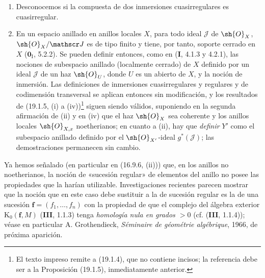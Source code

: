 \begin{remarks}[19.1.7]
\label{IV.19.1.7}
\begin{enumerate}
  \item[(i)] Desconocemos si la compuesta de dos inmersiones cuasirregulares es cuasirregular.
  \item[(ii)] En un espacio anillado en anillos locales $X$, para todo ideal $\mathscr J$ de $\sh{O}_X$, $\sh{O}_X/\mathscr J$ es de tipo finito y tiene, por tanto, soporte cerrado en $X$ ($\mathbf{0}_{\mathrm I}$, 5.2.2). Se pueden definir entonces, como en (\textbf I, 4.1.3 y 4.2.1), las nociones de subespacio anillado (localmente cerrado) de $X$ definido por un ideal $\mathscr J$ de un haz $\sh{O}_U$, donde $U$ es un abierto de $X$, y la noción de inmersión. Las definiciones de inmersiones cuasirregulares y regulares y de codimensión transversal se aplican entonces sin modificación, y los resultados de (19.1.5, (i) a (iv))\footnote{El texto impreso remite a (19.1.4), que no contiene incisos; la referencia debe ser a la Proposición (19.1.5), inmediatamente anterior.} siguen siendo válidos, suponiendo en la segunda afirmación de (ii) y en (iv) que el haz $\sh{O}_X$ sea coherente y los anillos locales $\sh{O}_{X,x}$ noetherianos; en cuanto a (ii), hay que \emph{definir} $Y'$ como el subespacio anillado definido por el $\sh{O}_{X'}$-ideal $g^*(\mathscr J)$; las demostraciones permanecen sin cambio.
\end{enumerate}
\end{remarks}

\begin{env}[19.1.8]
\label{IV.19.1.8}
Ya hemos señalado (en particular en (16.9.6, (ii))) que, en los anillos no noetherianos, la noción de «sucesión regular» de elementos del anillo no posee las propiedades que la harían utilizable. Investigaciones recientes parecen mostrar que la noción que en este caso debe sustituir a la de sucesión regular es la de una sucesión $\mathbf f=(f_1,\ldots,f_n)$ con la propiedad de que el complejo del álgebra exterior $\mathrm K_0(\mathbf f,M)$ (\textbf{III}, 1.1.3) tenga \emph{homología nula en grados $>0$} (cf. (\textbf{III}, 1.1.4)); véase en particular A. Grothendieck, \emph{Séminaire de géométrie algébrique}, 1966, de próxima aparición.
\end{env}

